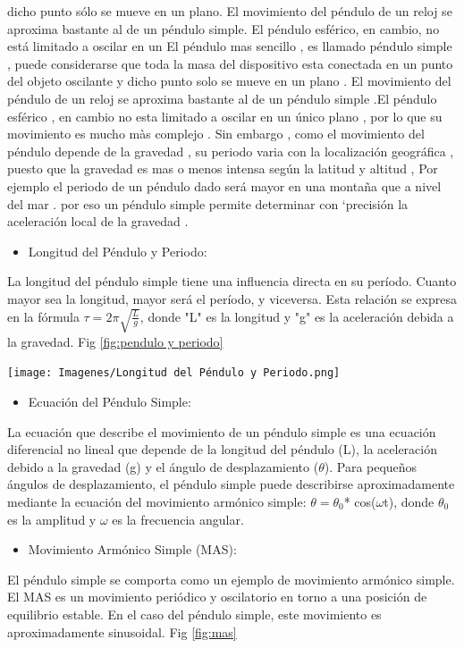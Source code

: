\documentclass[10pt]{article}
\begin{document}
\begin{multicols}{2}
dicho punto sólo se mueve en un plano. El movimiento del péndulo de un reloj se
aproxima bastante al de un péndulo simple. El péndulo esférico, en cambio, no
está limitado a oscilar en un 
El péndulo mas sencillo , es llamado péndulo simple , puede considerarse que toda la masa del dispositivo esta conectada en un punto del objeto oscilante y dicho punto solo se mueve en un plano . El movimiento del péndulo de un reloj se aproxima bastante al de un péndulo simple .El péndulo esférico , en cambio no esta limitado a oscilar en un único plano , por lo que su movimiento es mucho màs complejo . 
Sin embargo , como el movimiento del péndulo depende de la gravedad , su periodo varia con la localización geográfica , puesto que la gravedad es mas o menos intensa según la latitud y altitud , Por ejemplo el periodo de un  péndulo dado será mayor en una montaña que a nivel del mar . por eso un péndulo simple permite determinar con `precisión la aceleración local de la gravedad .
\begin{itemize}
	\item Longitud del Péndulo y Periodo:
\end{itemize}
 La longitud del péndulo simple tiene una influencia directa en su período. Cuanto mayor sea la longitud, mayor será el período, y viceversa. Esta relación se expresa en la fórmula $\tau = 2\pi \sqrt{\frac{L}{g}}$, donde "L" es la longitud y "g" es la aceleración debida a la gravedad. Fig \ref{fig:pendulo y periodo}

 \begin{center}
	\texttt{[image: Imagenes/Longitud del Péndulo y Periodo.png]}
	\label{fig:pendulo y periodo}
\end{center}
\begin{itemize}
	\item Ecuación del Péndulo Simple:
\end{itemize}
La ecuación que describe el movimiento de un péndulo simple es una ecuación diferencial no lineal que depende de la longitud del péndulo (L), la aceleración debido a la gravedad (g) y el ángulo de desplazamiento ($\theta$). Para pequeños ángulos de desplazamiento, el péndulo simple puede describirse aproximadamente mediante la ecuación del movimiento armónico simple: $\theta = \theta_{0} $* cos($\omega$t), donde $\theta_0$ es la amplitud y $\omega$ es la frecuencia angular.

\begin{itemize}
	\item Movimiento Armónico Simple (MAS): 
\end{itemize}
El péndulo simple se comporta como un ejemplo de movimiento armónico simple. El MAS es un movimiento periódico y oscilatorio en torno a una posición de equilibrio estable. En el caso del péndulo simple, este movimiento es aproximadamente sinusoidal. Fig \ref{fig:mas}


\end{multicols}
\end{document}
